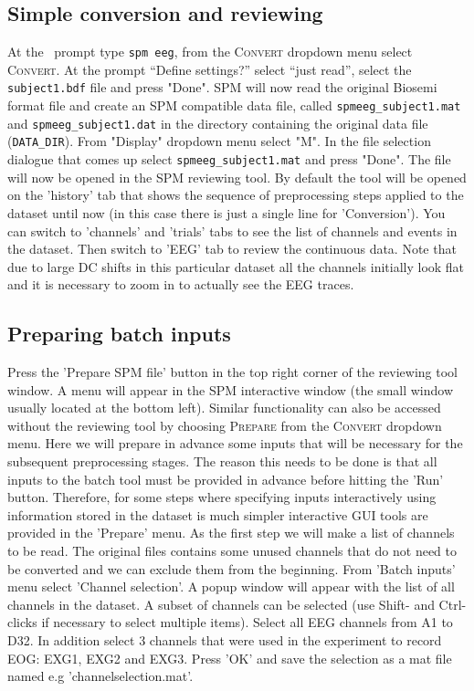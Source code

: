 \subsection{Simple conversion and reviewing}

At the \matlab\ prompt type \texttt{spm eeg}, from the \textsc{Convert} dropdown menu  select \textsc{Convert}. At the prompt ``Define settings?'' select ``just read'',  select the \texttt{subject1.bdf} file and press "Done". SPM will now read the original Biosemi format file and create an SPM compatible data file, called \texttt{spmeeg\_subject1.mat} and \texttt{spmeeg\_subject1.dat} in the directory containing the original data file (\texttt{DATA\_DIR}). From "Display" dropdown menu select "M\EEG". In the file selection dialogue that comes up select \texttt{spmeeg\_subject1.mat} and press "Done". The file will now be opened in the SPM reviewing tool. By default the tool will be opened on the 'history' tab that shows the sequence of preprocessing steps applied to the dataset until now (in this case there is just a single line for 'Conversion'). You can switch to 'channels' and 'trials' tabs to see the list of channels and events in  the dataset. Then switch to 'EEG' tab to review the continuous data. Note that due to large DC shifts in this particular dataset all the channels initially look flat and it is necessary to zoom in to actually see the EEG traces.

\subsection{Preparing batch inputs}
Press the 'Prepare SPM file' button in the top right corner of the reviewing tool window. A menu will appear in the SPM interactive window (the small window usually located at the bottom left). Similar functionality can also be accessed without the reviewing tool by choosing \textsc{Prepare} from the \textsc{Convert} dropdown menu. Here we will prepare in advance some inputs that will be necessary for the subsequent preprocessing stages. The reason this needs to be done is that all inputs to the batch tool must be provided in advance before hitting the 'Run' button. Therefore, for some steps where specifying inputs interactively using information stored in the dataset is much simpler interactive GUI tools are provided in the 'Prepare' menu. As the first step we will make a list of channels to be read. The original files contains some unused channels that do not need to be converted and we can exclude them from the beginning. From 'Batch inputs' menu select 'Channel selection'. A popup window will appear with the list of all channels in the dataset. A subset of channels can be selected (use Shift- and Ctrl- clicks if necessary to select multiple items). Select all EEG channels from A1 to D32. In addition select 3 channels that were used in the experiment to record EOG: EXG1, EXG2 and EXG3. Press 'OK' and save the selection as a mat file named e.g 'channelselection.mat'.

